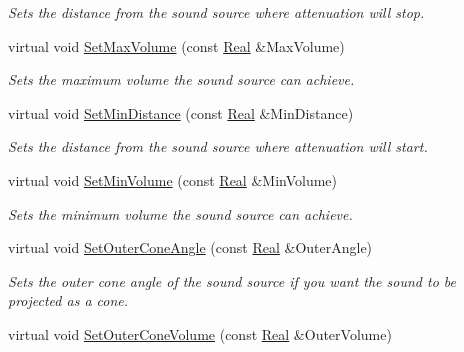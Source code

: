 \begin{DoxyCompactItemize}
\begin{DoxyCompactList}\small\item\em Sets the distance from the sound source where attenuation will stop. \item\end{DoxyCompactList}\item 
virtual void \hyperlink{classMezzanine_1_1Audio_1_1Sound_a938e5d0ab3367e9f2191b75b9f2829cd}{SetMaxVolume} (const \hyperlink{namespaceMezzanine_a726731b1a7df72bf3583e4a97282c6f6}{Real} \&MaxVolume)
\begin{DoxyCompactList}\small\item\em Sets the maximum volume the sound source can achieve. \item\end{DoxyCompactList}\item 
virtual void \hyperlink{classMezzanine_1_1Audio_1_1Sound_aac06e4db9ebd1e0f04ee1727539a1ff5}{SetMinDistance} (const \hyperlink{namespaceMezzanine_a726731b1a7df72bf3583e4a97282c6f6}{Real} \&MinDistance)
\begin{DoxyCompactList}\small\item\em Sets the distance from the sound source where attenuation will start. \item\end{DoxyCompactList}\item 
virtual void \hyperlink{classMezzanine_1_1Audio_1_1Sound_aaa56d27a3dcbf2b6e8a4b3b1141ad766}{SetMinVolume} (const \hyperlink{namespaceMezzanine_a726731b1a7df72bf3583e4a97282c6f6}{Real} \&MinVolume)
\begin{DoxyCompactList}\small\item\em Sets the minimum volume the sound source can achieve. \item\end{DoxyCompactList}\item 
virtual void \hyperlink{classMezzanine_1_1Audio_1_1Sound_a9d851625bb64c7f4a77eef305464a7f7}{SetOuterConeAngle} (const \hyperlink{namespaceMezzanine_a726731b1a7df72bf3583e4a97282c6f6}{Real} \&OuterAngle)
\begin{DoxyCompactList}\small\item\em Sets the outer cone angle of the sound source if you want the sound to be projected as a cone. \item\end{DoxyCompactList}\item 
virtual void \hyperlink{classMezzanine_1_1Audio_1_1Sound_ae99b53a8dcb610bb0df055ba0cd118fa}{SetOuterConeVolume} (const \hyperlink{namespaceMezzanine_a726731b1a7df72bf3583e4a97282c6f6}{Real} \&OuterVolume)

\end{DoxyCompactItemize}

